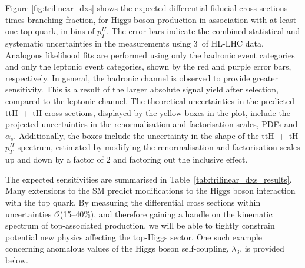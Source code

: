 Figure \ref{fig:trilinear_dxs} shows the expected differential fiducial cross sections times branching fraction, for Higgs boson production in association with at least one top quark, in bins of $p_T^H$. The error bars indicate the combined statistical and systematic uncertainties in the measurements using 3~\abinv of HL-LHC data. Analogous likelihood fits are performed using only the hadronic event categories and only the leptonic event categories, shown by the red and purple error bars, respectively. In general, the hadronic channel is observed to provide greater sensitivity. This is a result of the larger absolute signal yield after selection, compared to the leptonic channel. The theoretical uncertainties in the predicted ttH~+~tH cross sections, displayed by the yellow boxes in the plot, include the projected uncertainties in the renormalisation and factorisation scales, PDFs and $\alpha_s$. Additionally, the boxes include the uncertainty in the shape of the ttH~+~tH $p_T^H$ spectrum, estimated by modifying the renormalisation and factorisation scales up and down by a factor of 2 and factoring out the inclusive effect.

The expected sensitivities are summarised in Table~\ref{tab:trilinear_dxs_results}. Many extensions to the SM predict modifications to the Higgs boson interaction with the top quark. By measuring the differential cross sections within uncertainties $\mathcal{O}$(15--40\%), and therefore gaining a handle on the kinematic spectrum of top-associated production, we will be able to tightly constrain potential new physics affecting the top-Higgs sector. One such example concerning anomalous values of the Higgs boson self-coupling, $\lambda_3$, is provided below.

